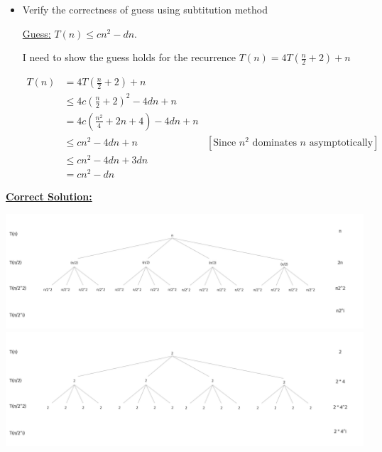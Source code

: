 \documentclass[12pt]{article}
\begin{document}
\begin{enumerate}[1.]
\begin{itemize}
        \item Verify the correctness of guess using subtitution method

        \bigskip

        \underline{Guess:} $T(n) \leq cn^2 - dn$.

        \bigskip

        I need to show the guess holds for the recurrence $T(n) = 4T(\frac{n}{2} +2) + n$

        \bigskip

        \begin{align}
            T(n) &= 4T(\frac{n}{2} +2) + n\\
            &\leq 4c (\frac{n}{2} + 2)^2 - 4dn  + n\\
            &= 4c (\frac{n^2}{4} + 2n + 4) - 4dn  + n\\
            &\leq cn^2 - 4dn  + n & [\text{Since $n^2$ dominates $n$ asymptotically}]\\
            &\leq cn^2 - 4dn  + 3dn\\
            &= cn^2 - dn
        \end{align}

    \end{itemize}

    \bigskip

    \begin{mdframed}
        \underline{\textbf{Correct Solution:}}

        \begin{center}
            \includegraphics[width=\linewidth]{images/worksheet_0_solution_6.png}
            \includegraphics[width=\linewidth]{images/worksheet_0_solution_7.png}
            \end{center}


\end{mdframed}
\end{enumerate}
\end{document}
